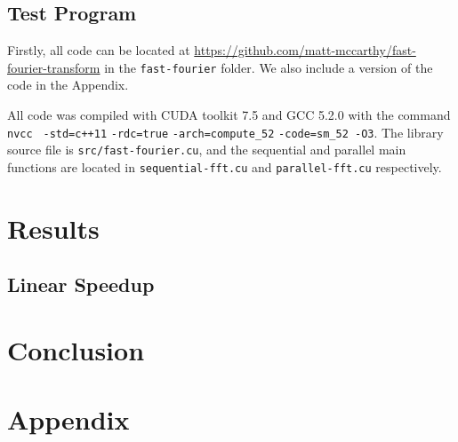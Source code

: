 \documentclass[notitlepage, twocolumn]{article}
\begin{document}
\subsection{Test Program}

Firstly, all code can be located at \url{https://github.com/matt-mccarthy/fast-fourier-transform} in the \verb|fast-fourier| folder.
We also include a version of the code in the Appendix.

All code was compiled with CUDA toolkit 7.5 and GCC 5.2.0 with the command \verb|nvcc| \verb| -std=c++11| \verb|-rdc=true| \verb|-arch=compute_52| \verb|-code=sm_52 -O3|.
The library source file is \verb|src/fast-fourier.cu|, and the sequential and parallel main functions are located in \verb|sequential-fft.cu| and \verb|parallel-fft.cu| respectively.

\section{Results}

\subsection{Linear Speedup}

\section{Conclusion}

\section*{Appendix}
\end{document}
